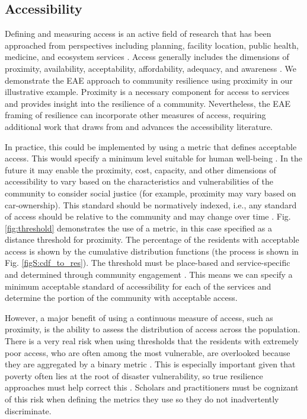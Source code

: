 \documentclass[onecolumn,doublespacing]{risa}
\let \cite \parencite
\begin{document}
\subsection{Accessibility}
Defining and measuring access is an active field of research that has been approached from perspectives including planning, facility location, public health, medicine, and ecosystem services \cite{Penchansky1981-qh,Saurman2016-gj,Talen2003-dc, Talen1998-mk, Logan2017-fr, noel2019-pypi}.
Access generally includes the dimensions of proximity, availability, acceptability, affordability, adequacy, and awareness \cite{Saurman2016-gj, Penchansky1981-qh}. 
We demonstrate the EAE approach to community resilience using proximity in our illustrative example.
Proximity is a necessary component for access to services and provides insight into the resilience of a community. 
Nevertheless, the EAE framing of resilience can incorporate other measures of access, requiring additional work that draws from and advances the accessibility literature.

In practice, this could be implemented by using a metric that defines acceptable access.
This would specify a minimum level suitable for human well-being \cite{Doorn2018-fx}.
In the future it may enable the proximity, cost, capacity, and other dimensions of accessibility to vary based on the characteristics and vulnerabilities of the community to consider social justice (for example, proximity may vary based on car-ownership).
This standard should be normatively indexed, i.e., any standard of access should be relative to the community and may change over time \cite{Constas2014-ui}.
Fig. \ref{fig:threshold} demonstrates the use of a metric, in this case specified as a distance threshold for proximity.
The percentage of the residents with acceptable access is shown by the cumulative distribution functions (the process is shown in Fig. \ref{figS:cdf_to_res}). 
The threshold must be place-based and service-specific and determined through community engagement \cite{Pantelic1991-qu, United_Nations_Educational_Scientific_and_Cultural_Organization2018-sf}.
This means we can specify a minimum acceptable standard of accessibility for each of the services and determine the portion of the community with acceptable access.

However, a major benefit of using a continuous measure of access, such as proximity, is the ability to assess the distribution of access across the population. 
There is a very real risk when using thresholds that the residents with extremely poor access, who are often among the most vulnerable, are overlooked because they are aggregated by a binary metric \cite{Logan2017-fr}. 
This is especially important given that poverty often lies at the root of disaster vulnerability, so true resilience approaches must help correct this \cite{Pantelic1991-qu}.
Scholars and practitioners must be cognizant of this risk when defining the metrics they use so they do not inadvertently discriminate. 
\end{document}
